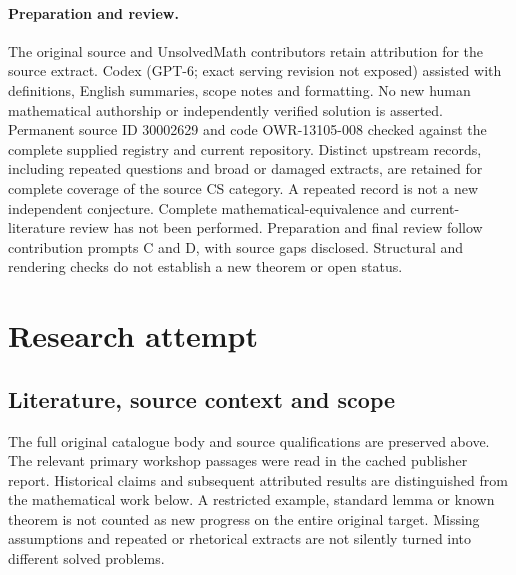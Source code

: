 \documentclass[11pt]{article}
\begin{document}
\paragraph{Preparation and review.}
The original source and UnsolvedMath contributors retain attribution for the source extract. Codex (GPT-6; exact serving revision not exposed) assisted with definitions, English summaries, scope notes and formatting. No new human mathematical authorship or independently verified solution is asserted. Permanent source ID 30002629 and code OWR-13105-008 checked against the complete supplied registry and current repository. Distinct upstream records, including repeated questions and broad or damaged extracts, are retained for complete coverage of the source CS category. A repeated record is not a new independent conjecture. Complete mathematical-equivalence and current-literature review has not been performed. Preparation and final review follow contribution prompts C and D, with source gaps disclosed. Structural and rendering checks do not establish a new theorem or open status.
\label{end:30002629}

\section{Research attempt}
\subsection{Literature, source context and scope}
The full original catalogue body and source qualifications are preserved above. The relevant primary workshop passages were read in the cached publisher report. Historical claims and subsequent attributed results are distinguished from the mathematical work below. A restricted example, standard lemma or known theorem is not counted as new progress on the entire original target. Missing assumptions and repeated or rhetorical extracts are not silently turned into different solved problems.
\end{document}
